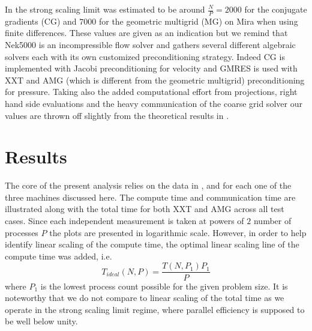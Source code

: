 \documentclass{sig-alternate}
\begin{document}
In \cite{fischer:scaling} the strong scaling limit  was estimated
to be around $\frac{N}{P}=2000$ for the conjugate gradients (CG) and %
$7000$ for the geometric multigrid (MG) on Mira when using finite
differences. These values are given as an indication %
but we remind that Nek5000 is an incompressible flow solver and gathers several different algebraic 
solvers each with its own customized preconditioning strategy. Indeed CG is implemented 
with Jacobi preconditioning for velocity and GMRES is used with XXT and AMG (which 
is different from the geometric multigrid) preconditioning for pressure. 
Taking also the added computational effort from projections, right hand side 
evaluations and the heavy communication of the coarse grid solver our values are 
thrown off slightly from the theoretical results in \cite{fischer:scaling}. 

\section{Results}


The core of the present analysis relies on the data in ,  and  for each one of the three machines discussed here. 
The compute time and
communication time are illustrated along with the total time for both XXT and AMG across all test cases. 
Since each independent measurement is taken at powers of $2$ number of processes $P$ 
the plots are presented in logarithmic scale. However, in order to help identify linear scaling of the
compute time, the optimal linear scaling line of the compute time was added, i.e.
$$
T_{ideal}(N,P)=\frac{T(N,P_1)P_1}{P}
$$
where $P_1$ is the lowest process count possible for the given problem size. It is noteworthy that we do not compare to linear scaling of the total time as we operate in the strong scaling limit regime, where parallel efficiency is supposed to be well below unity.
\end{document}
